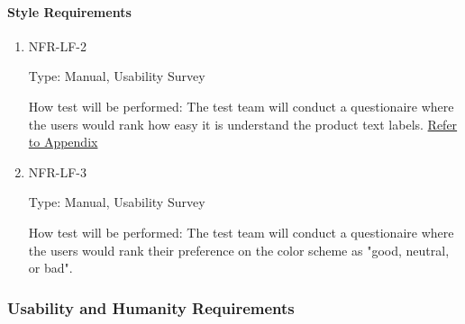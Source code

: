 \documentclass[12pt, titlepage]{article}
\begin{document}
\paragraph{Style Requirements}

\begin{enumerate}

\item{NFR-LF-2\\}

Type: Manual, Usability Survey
					
How test will be performed: The test team will conduct a questionaire where the users would rank how easy it is understand the product text labels.  \hyperref[Appendix]{Refer to Appendix}

\item{NFR-LF-3\\}

Type: Manual, Usability Survey
					
How test will be performed: The test team will conduct a questionaire where the users would rank their preference on the color scheme as "good, neutral, or bad". 

\end{enumerate}

\subsubsection{Usability and Humanity Requirements}
\end{document}
